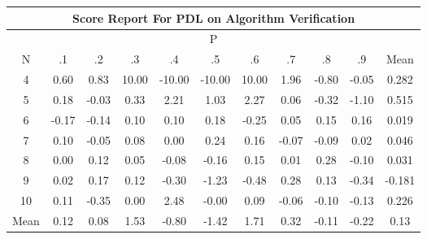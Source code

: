 \documentclass[11pt,a4paper]{report}
\begin{document}
\begin{longtable}{ | c || c | c | c | c | c | c | c | c | c || c |}
\hline
\multicolumn{11}{|c|}{ Score Report For PDL on Algorithm Verification} \\
\hline
\multicolumn{11}{|c|}{ P } \\
\hline
N & .1 & .2 & .3 & .4 & .5 & .6 & .7 & .8 & .9 & Mean\\
 \hline
 \hline
 \endhead
  4 &  \cellcolor[HTML]{EFEFFF} 0.60 &  \cellcolor[HTML]{E7E7FF} 0.83 &  \cellcolor[HTML]{0808FF} 10.00 &  \cellcolor[HTML]{FF0000} -10.00 &  \cellcolor[HTML]{FF0000} -10.00 &  \cellcolor[HTML]{0808FF} 10.00 &  \cellcolor[HTML]{CFCFFF} 1.96 &  \cellcolor[HTML]{FFE7E7} -0.80 &  \cellcolor[HTML]{FFFFFF} -0.05 & 0.282 \\
  5 &  \cellcolor[HTML]{F7F7FF} 0.18 &  \cellcolor[HTML]{FFFFFF} -0.03 &  \cellcolor[HTML]{F7F7FF} 0.33 &  \cellcolor[HTML]{C7C7FF} 2.21 &  \cellcolor[HTML]{E7E7FF} 1.03 &  \cellcolor[HTML]{C7C7FF} 2.27 &  \cellcolor[HTML]{FFFFFF} 0.06 &  \cellcolor[HTML]{FFF7F7} -0.32 &  \cellcolor[HTML]{FFE7E7} -1.10 & 0.515 \\
  6 &  \cellcolor[HTML]{FFF7F7} -0.17 &  \cellcolor[HTML]{FFFFFF} -0.14 &  \cellcolor[HTML]{FFFFFF} 0.10 &  \cellcolor[HTML]{FFFFFF} 0.10 &  \cellcolor[HTML]{F7F7FF} 0.18 &  \cellcolor[HTML]{FFF7F7} -0.25 &  \cellcolor[HTML]{FFFFFF} 0.05 &  \cellcolor[HTML]{FFFFFF} 0.15 &  \cellcolor[HTML]{FFFFFF} 0.16 & 0.019 \\
  7 &  \cellcolor[HTML]{FFFFFF} 0.10 &  \cellcolor[HTML]{FFFFFF} -0.05 &  \cellcolor[HTML]{FFFFFF} 0.08 &  \cellcolor[HTML]{FFFFFF} 0.00 &  \cellcolor[HTML]{F7F7FF} 0.24 &  \cellcolor[HTML]{F7F7FF} 0.16 &  \cellcolor[HTML]{FFFFFF} -0.07 &  \cellcolor[HTML]{FFFFFF} -0.09 &  \cellcolor[HTML]{FFFFFF} 0.02 & 0.046 \\
  8 &  \cellcolor[HTML]{FFFFFF} 0.00 &  \cellcolor[HTML]{FFFFFF} 0.12 &  \cellcolor[HTML]{FFFFFF} 0.05 &  \cellcolor[HTML]{FFFFFF} -0.08 &  \cellcolor[HTML]{FFFFFF} -0.16 &  \cellcolor[HTML]{FFFFFF} 0.15 &  \cellcolor[HTML]{FFFFFF} 0.01 &  \cellcolor[HTML]{F7F7FF} 0.28 &  \cellcolor[HTML]{FFFFFF} -0.10 & 0.031 \\
  9 &  \cellcolor[HTML]{FFFFFF} 0.02 &  \cellcolor[HTML]{F7F7FF} 0.17 &  \cellcolor[HTML]{FFFFFF} 0.12 &  \cellcolor[HTML]{FFF7F7} -0.30 &  \cellcolor[HTML]{FFDFDF} -1.23 &  \cellcolor[HTML]{FFEFEF} -0.48 &  \cellcolor[HTML]{F7F7FF} 0.28 &  \cellcolor[HTML]{FFFFFF} 0.13 &  \cellcolor[HTML]{FFF7F7} -0.34 & -0.181 \\
  10 &  \cellcolor[HTML]{FFFFFF} 0.11 &  \cellcolor[HTML]{FFF7F7} -0.35 &  \cellcolor[HTML]{FFFFFF} 0.00 &  \cellcolor[HTML]{BFBFFF} 2.48 &  \cellcolor[HTML]{FFFFFF} -0.00 &  \cellcolor[HTML]{FFFFFF} 0.09 &  \cellcolor[HTML]{FFFFFF} -0.06 &  \cellcolor[HTML]{FFFFFF} -0.10 &  \cellcolor[HTML]{FFFFFF} -0.13 & 0.226 \\
 \hline
 \hline
Mean &  \cellcolor[HTML]{FFFFFF} 0.12 &  \cellcolor[HTML]{FFFFFF} 0.08 &  \cellcolor[HTML]{D7D7FF} 1.53 &  \cellcolor[HTML]{FFE7E7} -0.80 &  \cellcolor[HTML]{FFDFDF} -1.42 &  \cellcolor[HTML]{D7D7FF} 1.71 &  \cellcolor[HTML]{F7F7FF} 0.32 &  \cellcolor[HTML]{FFFFFF} -0.11 &  \cellcolor[HTML]{FFF7F7} -0.22 &  \cellcolor[HTML]{FFFFFF} 0.13
\end{longtable}
\end{document}
